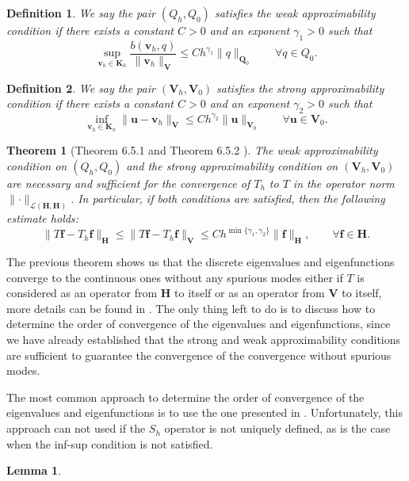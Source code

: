 \documentclass[USenglish]{article}
\theoremstyle{dgthm}
\newtheorem{theorem}{Theorem}
\newtheorem{lemma}{Lemma}
\theoremstyle{dgdef}
\newtheorem{definition}{Definition}
\let\vec\bm
\newcommand\norm[1]{\lVert#1\rVert}
\begin{document}
\begin{definition}
  We say the pair $(Q_h,Q_0)$ satisfies the weak approximability condition if there exists a constant $C>0$ and an exponent $\gamma_1>0$ such that
  \begin{equation}
    \underset{\vec{v}_h\in \vec{K}_h}{\sup} \frac{b(\vec{v}_h,q)}{\norm{\vec{v}_h}_{\vec{V}}} \leq C h^{\gamma_1}\norm{q}_{\vec{Q}_0} \qquad \forall q\in Q_0.
  \end{equation}
\end{definition}
\begin{definition}
  We say the pair $(\vec{V}_h,\vec{V}_0)$ satisfies the strong approximability condition if there exists a constant $C>0$ and an exponent $\gamma_2>0$ such that
  \begin{equation}
    \label{eq:weakApprox}
    \underset{\vec{v}_h\in \vec{K}_h}{\inf} \norm{\vec{u}-\vec{v}_h}_{\vec{V}} \leq C h^{\gamma_2}\norm{\vec{u}}_{\vec{V}_0} \qquad \forall \vec{u}\in \vec{V}_0.
  \end{equation}
\end{definition}
\begin{theorem}[Theorem 6.5.1 and Theorem 6.5.2 \cite{BBF}]
  The weak approximability condition on $(Q_h,Q_0)$ and the strong approximability condition on $(\vec{V}_h,\vec{V}_0)$ are necessary and sufficient for the convergence of $T_h$ to $T$ in the operator norm $\norm{\cdot}_{\mathcal{L}(\vec{H},\vec{H})}$.
  In particular, if both conditions are satisfied, then the following estimate holds:
  \begin{equation}
    \norm{T\vec{f}-T_h\vec{f}}_{\vec{H}}\leq \norm{T\vec{f}-T_h\vec{f}}_{\vec{V}}\leq C h^{\min\{\gamma_1,\gamma_2\}}\norm{\vec{f}}_{\vec{H}}, \qquad \forall \vec{f}\in \vec{H}.
  \end{equation}
\end{theorem}
The previous theorem shows us that the discrete eigenvalues and eigenfunctions converge to the continuous ones without any spurious modes either if $T$ is considered as an operator from $\vec{H}$ to itself or as an operator from $\vec{V}$ to itself, more details can be found in \cite{Osborn, Boffi}.
The only thing left to do is to discuss how to determine the order of convergence of the eigenvalues and eigenfunctions, since we have already established that the strong and weak approximability conditions are sufficient to guarantee the convergence of the convergence without spurious modes.

The most common approach to determine the order of convergence of the eigenvalues and eigenfunctions is to use the one presented in \cite{MercierOsbornRappazRaviart}.
Unfortunately, this approach can not used if the $S_h$ operator is not uniquely defined, as is the case when the inf-sup condition is not satisfied.
\begin{lemma}
  
\end{lemma}
\end{document}
